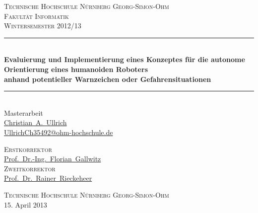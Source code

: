 \author{Ullrich}
\begin{titlepage}
\begin{center}
\newcommand{\HRule}{\rule{\linewidth}{0.5mm}}

\textsc{\large Technische Hochschule N\"urnberg Georg-Simon-Ohm}\\[0.3cm]

\textsc{\normalsize Fakult\"at Informatik}\\[1.0cm]

\textsc{\large Wintersemester 2012/13}\\[1.0cm]

\setlength{\baselineskip}{2.0\baselineskip}


\HRule\\[0.5cm]
{\Large \bfseries Evaluierung und Implementierung eines Konzeptes für die autonome Orientierung eines humanoiden Roboters\\[0.5cm]
\large \bfseries anhand potentieller Warnzeichen oder Gefahrensituationen\\[0.2cm]}

\HRule\\[1.5cm]
\Large{Masterarbeit}\\        
{\href{mailto:UllrichCh35492@ohm-hochschule.de}{\Large Christian~A.~Ullrich}}\\
{\href{mailto:UllrichCh35492@ohm-hochschule.de}{\large UllrichCh35492@ohm-hochschule.de}} \\[0.4cm]

\begin{minipage}{0.6\textwidth}
\begin{center}
\textsc{\large Erstkorrektor}\\[0.3cm]
{\large
\href{mailto:Florian.Gallwitz@ohm-hochschule.de}{Prof.~Dr.-Ing.~Florian~Gallwitz}} \\[0.4cm]
\textsc{\large Zweitkorrektor}\\[0.3cm]
{\large
\href{mailto:Rainer.Rieckeheer@ohm-hochschule.de}{Prof.~Dr.~Rainer~Rieckeheer}} \\

\end{center}
\end{minipage}

\vfill

{
\textsc{\small Technische Hochschule N\"urnberg Georg-Simon-Ohm} \\[0.3cm]
\large 15. April 2013}


\end{center}
\end{titlepage}